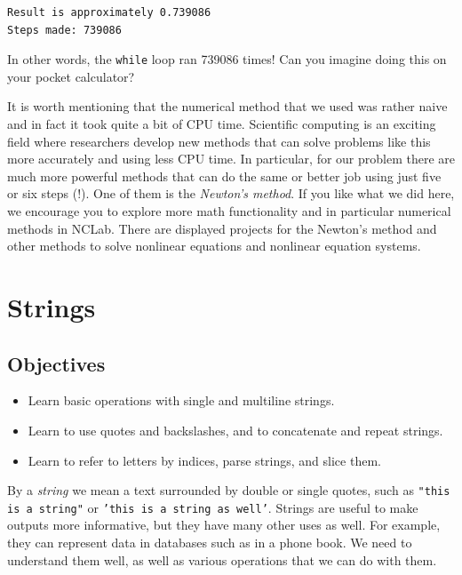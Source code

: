 \documentclass[article,A4,12pt]{llncs}
\begin{document}
\begin{ybox}
\begin{verbatim}
Result is approximately 0.739086
Steps made: 739086
\end{verbatim}
\end{ybox}
\vspace{6mm}

\noindent
In other words, the {\tt while} loop ran 739086 times! Can you 
imagine doing this on your pocket calculator?

It is worth mentioning that the numerical method that we used was rather 
naive and in fact it took quite a bit of CPU time. Scientific computing
is an exciting field where researchers develop new methods that 
can solve problems like this more accurately and using less CPU time. 
In particular, for our problem there are much more powerful methods that can do the
same or better job using just five or six steps (!). One of them 
is the {\em Newton's method}. If you like what we did here, we encourage 
you to explore more math functionality and in particular numerical 
methods in NCLab. There are displayed projects for the Newton's method
and other methods to solve nonlinear equations and nonlinear equation systems.


\section{Strings} \label{sec:strings}

\subsection{Objectives}

\begin{itemize}
\item Learn basic operations with single and multiline strings.
\item Learn to use quotes and backslashes, and to concatenate and repeat strings.
\item Learn to refer to letters by indices, parse strings, and slice them.
\end{itemize}
By a {\em string} we mean a text surrounded by double or single quotes, such as 
{\tt "this is a string"} or {\tt 'this is a string as well'}.
Strings are useful to make outputs more informative, but 
they have many other uses as well. For example, they can represent data 
in databases such as in a phone book. We need to understand them well,
as well as various operations that we can do with them.
\end{document}
